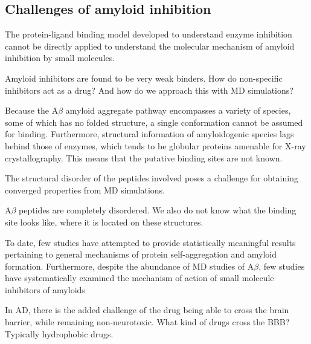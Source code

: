 \subsection{Challenges of amyloid inhibition}
\begin{outline}

    \1 The protein-ligand binding model developed to understand enzyme inhibition cannot be directly applied to understand the molecular mechanism of amyloid inhibition by small molecules. 
    
      \2 Amyloid inhibitors are found to be very weak binders. How do non-specific inhibitors act as a drug? And how do we approach this with MD simulations?
      
      \2  Because the A$\beta$ amyloid aggregate pathway encompasses a variety of species, some of which has no folded structure, a single conformation cannot be assumed for binding. Furthermore, structural information of amyloidogenic species lags behind those of enzymes, which tends to be globular proteins amenable for X-ray crystallography. This means that the putative binding sites are not known.
      
      \2 The structural disorder of the peptides involved poses a challenge for obtaining converged properties from MD simulations. 
    
    	\1 A$\beta$ peptides are completely disordered.  We also do not know what the binding site looks like, where it is located on these structures.
    	
    \1 To date, few studies have attempted to provide statistically meaningful results pertaining to general mechanisms of protein self-aggregation and amyloid formation. Furthermore, despite the abundance of MD studies of A$\beta$, few studies have systematically examined the mechanism of action of small molecule inhibitors of amyloids

    \1 In AD, there is the added challenge of the drug being able to cross the brain barrier, while remaining non-neurotoxic.  What kind of drugs cross the BBB?  Typically hydrophobic drugs.
\end{outline}    

